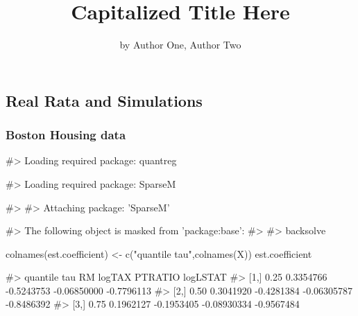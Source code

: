 \title{Capitalized Title Here}
\author{by Author One, Author Two}

\maketitle


\hypertarget{real-rata-and-simulations}{%
\subsection{Real Rata and Simulations}\label{real-rata-and-simulations}}

\hypertarget{boston-housing-data}{%
\subsubsection{Boston Housing data}\label{boston-housing-data}}

\begin{Schunk}
\begin{Soutput}
#> Loading required package: quantreg
\end{Soutput}
\begin{Soutput}
#> Loading required package: SparseM
\end{Soutput}
\begin{Soutput}
#> 
#> Attaching package: 'SparseM'
\end{Soutput}
\begin{Soutput}
#> The following object is masked from 'package:base':
#> 
#>     backsolve
\end{Soutput}
\begin{Sinput}
colnames(est.coefficient) <- c("quantile tau",colnames(X))
est.coefficient
\end{Sinput}
\begin{Soutput}
#>      quantile tau        RM     logTAX     PTRATIO   logLSTAT
#> [1,]         0.25 0.3354766 -0.5243753 -0.06850000 -0.7796113
#> [2,]         0.50 0.3041920 -0.4281384 -0.06305787 -0.8486392
#> [3,]         0.75 0.1962127 -0.1953405 -0.08930334 -0.9567484
\end{Soutput}
\end{Schunk}

